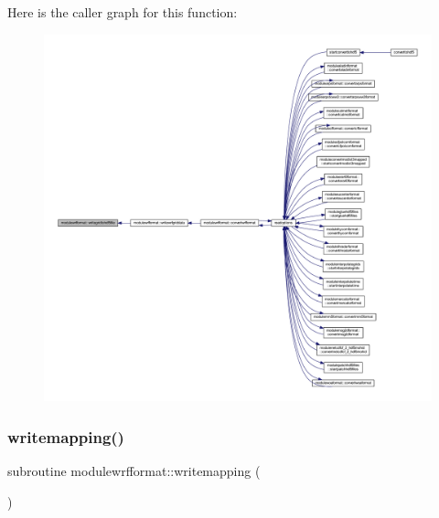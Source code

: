 Here is the caller graph for this function\+:\nopagebreak
\begin{figure}[H]
\begin{center}
\leavevmode
\includegraphics[width=350pt]{namespacemodulewrfformat_a05d05aad9544d129c314b6f52333b039_icgraph}
\end{center}
\end{figure}
\mbox{\label{namespacemodulewrfformat_a2d9d50bc96864ebc8514152b797f5465}} 
\subsubsection{\texorpdfstring{writemapping()}{writemapping()}}
{\footnotesize\ttfamily subroutine modulewrfformat\+::writemapping (\begin{DoxyParamCaption}{ }\end{DoxyParamCaption})\hspace{0.3cm}{\ttfamily [private]}}

